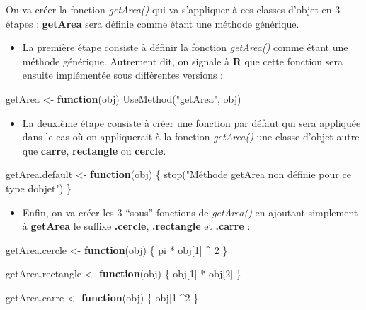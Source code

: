 \documentclass[
]{book}
\newenvironment{Shaded}{\begin{snugshade}}{\end{snugshade}}
\newcommand{\ControlFlowTok}[1]{\textcolor[rgb]{0.13,0.29,0.53}{\textbf{#1}}}
\newcommand{\DecValTok}[1]{\textcolor[rgb]{0.00,0.00,0.81}{#1}}
\newcommand{\FunctionTok}[1]{\textcolor[rgb]{0.00,0.00,0.00}{#1}}
\newcommand{\NormalTok}[1]{#1}
\newcommand{\OtherTok}[1]{\textcolor[rgb]{0.56,0.35,0.01}{#1}}
\newcommand{\SpecialCharTok}[1]{\textcolor[rgb]{0.00,0.00,0.00}{#1}}
\newcommand{\StringTok}[1]{\textcolor[rgb]{0.31,0.60,0.02}{#1}}
\providecommand{\tightlist}{%
  \setlength{\itemsep}{0pt}\setlength{\parskip}{0pt}}
\theoremstyle{definition}
\theoremstyle{definition}
\theoremstyle{definition}
\theoremstyle{definition}
\theoremstyle{remark}
\begin{document}
On va créer la fonction \emph{getArea()} qui va s'appliquer à ces classes d'objet en 3 étapes : \textbf{getArea} sera définie comme étant une méthode générique.

\begin{itemize}
\tightlist
\item
  La première étape consiste à définir la fonction \emph{getArea()} comme étant une méthode générique. Autrement dit, on signale à \textbf{R} que cette fonction sera ensuite implémentée sous différentes versions :
\end{itemize}

\begin{Shaded}
\begin{Highlighting}[]
\NormalTok{getArea }\OtherTok{\textless{}{-}} \ControlFlowTok{function}\NormalTok{(obj)}
  \FunctionTok{UseMethod}\NormalTok{(}\StringTok{"getArea"}\NormalTok{, obj)}
\end{Highlighting}
\end{Shaded}

\begin{itemize}
\tightlist
\item
  La deuxième étape consiste à créer une fonction par défaut qui sera appliquée dans le cas où on appliquerait à la fonction \emph{getArea()} une classe d'objet autre que \textbf{carre}, \textbf{rectangle} ou \textbf{cercle}.
\end{itemize}

\begin{Shaded}
\begin{Highlighting}[]
\NormalTok{getArea.default }\OtherTok{\textless{}{-}} \ControlFlowTok{function}\NormalTok{(obj) \{}
  \FunctionTok{stop}\NormalTok{(}\StringTok{"Méthode getArea non définie pour ce type d\textquotesingle{}objet"}\NormalTok{)}
\NormalTok{\}}
\end{Highlighting}
\end{Shaded}

\begin{itemize}
\tightlist
\item
  Enfin, on va créer les 3 ``sous'' fonctions de \emph{getArea()} en ajoutant simplement à \textbf{getArea} le suffixe \textbf{.cercle}, \textbf{.rectangle} et \textbf{.carre} :
\end{itemize}

\begin{Shaded}
\begin{Highlighting}[]
\NormalTok{getArea.cercle }\OtherTok{\textless{}{-}} \ControlFlowTok{function}\NormalTok{(obj) \{}
\NormalTok{  pi }\SpecialCharTok{*}\NormalTok{ obj[}\DecValTok{1}\NormalTok{] }\SpecialCharTok{\^{}} \DecValTok{2}
\NormalTok{\}}

\NormalTok{getArea.rectangle }\OtherTok{\textless{}{-}} \ControlFlowTok{function}\NormalTok{(obj) \{}
\NormalTok{  obj[}\DecValTok{1}\NormalTok{] }\SpecialCharTok{*}\NormalTok{ obj[}\DecValTok{2}\NormalTok{]}
\NormalTok{\}}

\NormalTok{getArea.carre }\OtherTok{\textless{}{-}} \ControlFlowTok{function}\NormalTok{(obj) \{}
\NormalTok{  obj[}\DecValTok{1}\NormalTok{]}\SpecialCharTok{\^{}}\DecValTok{2}
\NormalTok{\}}
\end{Highlighting}
\end{Shaded}
\end{document}
